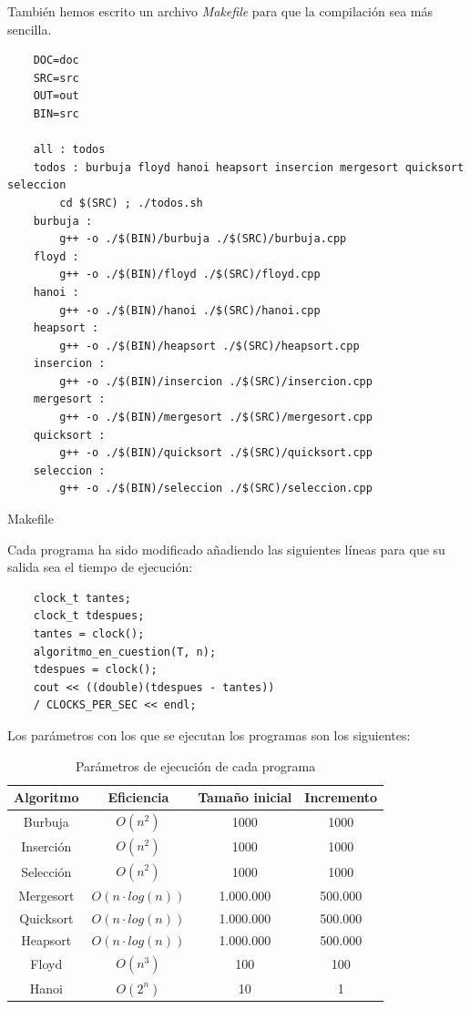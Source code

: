 \documentclass[12pt,spanish]{article}
\begin{document}
También hemos escrito un archivo \textit{Makefile} para que la compilación sea más sencilla.
\begin{listing}[H]
\begin{verbatim}
	DOC=doc
	SRC=src
	OUT=out
	BIN=src

	all : todos
	todos : burbuja floyd hanoi heapsort insercion mergesort quicksort seleccion
		cd $(SRC) ; ./todos.sh
	burbuja : 
		g++ -o ./$(BIN)/burbuja ./$(SRC)/burbuja.cpp
	floyd : 
		g++ -o ./$(BIN)/floyd ./$(SRC)/floyd.cpp
	hanoi : 
		g++ -o ./$(BIN)/hanoi ./$(SRC)/hanoi.cpp
	heapsort : 
		g++ -o ./$(BIN)/heapsort ./$(SRC)/heapsort.cpp
	insercion : 
		g++ -o ./$(BIN)/insercion ./$(SRC)/insercion.cpp
	mergesort : 
		g++ -o ./$(BIN)/mergesort ./$(SRC)/mergesort.cpp
	quicksort : 
		g++ -o ./$(BIN)/quicksort ./$(SRC)/quicksort.cpp
	seleccion :
		g++ -o ./$(BIN)/seleccion ./$(SRC)/seleccion.cpp
\end{verbatim}
\caption{Makefile}
\end{listing}
Cada programa ha sido modificado añadiendo las siguientes líneas para que su salida sea el tiempo de ejecución:

\begin{verbatim}
	clock_t tantes;
	clock_t tdespues;
	tantes = clock();
	algoritmo_en_cuestion(T, n);
	tdespues = clock();
	cout << ((double)(tdespues - tantes))
	/ CLOCKS_PER_SEC << endl;
\end{verbatim}

Los parámetros con los que se ejecutan los programas son los siguientes:
\begin{table}[H]
\centering
\begin{tabular}{|c|c|c|c|}
\hline
\textbf{Algoritmo} & \textbf{Eficiencia} & \textbf{Tamaño inicial} & \textbf{Incremento}\\
\hline
Burbuja & $O(n^2)$ & 1000 & 1000 \\
\hline
Inserción & $O(n^2)$ & 1000 & 1000 \\
\hline
Selección & $O(n^2)$ & 1000 & 1000 \\
\hline
Mergesort & $O(n \cdot log(n))$ & 1.000.000 & 500.000 \\
\hline
Quicksort & $O(n \cdot log(n))$ & 1.000.000 & 500.000 \\
\hline
Heapsort & $O(n \cdot log(n))$ & 1.000.000 & 500.000 \\
\hline
Floyd & $O(n^3)$ & 100 & 100 \\
\hline
Hanoi & $O(2^n)$ & 10 & 1 \\
\hline
\end{tabular}
\caption{Parámetros de ejecución de cada programa}
\end{table}
\end{document}
